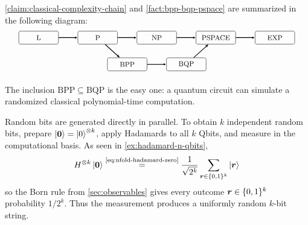 \autoref{claim:classical-complexity-chain} and \autoref{fact:bpp-bqp-pspace} are summarized in the following diagram:
\[
\begin{tikzpicture}[
  scale=0.82,
  >=Stealth,
  class/.style={
    draw,
    rounded corners=2pt,
    minimum width=1.65cm,
    minimum height=0.54cm,
    align=center,
    inner sep=2pt,
    font=\footnotesize
  },
  inc/.style={-{Stealth[length=1.45mm]}, thick},
  note/.style={font=\scriptsize, align=center}
]
  \node[class] (L) at (0,1.35) {$\mathrm{L}$};
  \node[class] (P) at (3,1.35) {$\mathrm{P}$};
  \node[class] (NP) at (6,1.35) {$\mathrm{NP}$};
  \node[class] (PSPACE) at (9,1.35) {$\mathrm{PSPACE}$};
  \node[class] (EXP) at (12,1.35) {$\mathrm{EXP}$};

  \node[class] (BPP) at (4.5,0) {$\mathrm{BPP}$};
  \node[class] (BQP) at (7.5,0) {$\mathrm{BQP}$};

  \draw[inc] (L) -- (P);
  \draw[inc] (P) -- (NP);
  \draw[inc] (NP) -- (PSPACE);
  \draw[inc] (PSPACE) -- (EXP);
  \draw[inc] (P) -- (BPP);
  \draw[inc] (BPP) -- (BQP);
  \draw[inc] (BQP) -- (PSPACE);

\end{tikzpicture}
\]


The inclusion \(\mathrm{BPP}\subseteq\mathrm{BQP}\) is the easy one:
a quantum circuit can simulate a randomized classical polynomial-time computation.

Random bits are generated directly in parallel.
To obtain \(k\) independent random bits, prepare
\(
\ket{{\boldsymbol{0}}}
=
\ket{0}^{\otimes k}
\),
apply Hadamards to all \(k\) Qbits, and measure in the computational basis.
As seen in \autoref{ex:hadamard-n-qbits},
\[
H^{\otimes k}\ket{{\boldsymbol{0}}}
\overset{\text{\eqref{eq:nfold-hadamard-zero}}}{=}
\frac{1}{\sqrt{2^k}}
\sum_{{\boldsymbol{r}}\in\{0,1\}^k}
\ket{{\boldsymbol{r}}}
\]
so the Born rule from \autoref{sec:observables} gives every outcome \({\boldsymbol{r}}\in\{0,1\}^k\) probability \(1/2^k\).
Thus the measurement produces a uniformly random \(k\)-bit string.

